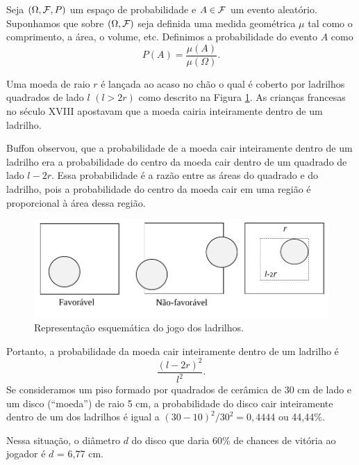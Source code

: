 \begin{frame}
 \begin{defi}  Seja $(\Omega ,{\cal F}, P)$ um espaço de probabilidade e  $A \in {\cal F}$ um evento aleatório. Suponhamos que sobre $(\Omega ,{\cal F})$ seja definida uma medida geométrica $\mu$ tal como o comprimento, a área, o volume, etc. Definimos a probabilidade do evento $A$ como 
\begin{equation}
\label{pgeo}
P(A) = \frac{\mu(A)}{\mu(\Omega)}.
\end{equation}
\end{defi}

\begin{exem} 
Uma moeda de raio $r$ é lançada ao acaso no chão o qual é coberto por
ladrilhos quadrados de lado $l$ $(l > 2r)$ como descrito na Figura \ref{fig7}. As crianças francesas no século XVIII apostavam que a moeda
cairia inteiramente dentro de um ladrilho. 

Buffon observou, que a probabilidade de a moeda cair inteiramente dentro
de um ladrilho era a probabilidade do centro da moeda cair dentro de um
quadrado de lado $l - 2r$. Essa probabilidade é a razão entre as áreas do quadrado e do ladrilho,
pois a probabilidade do centro da moeda cair em uma região é proporcional
à área dessa região.


\end{exem}
\end{frame}

\begin{frame}

\begin{figure}[!htb]
\begin{center}
\includegraphics[angle=0, scale=0.5]{fig7.pdf}
\end{center}
\caption{\label{fig7} Representação esquemática do jogo dos ladrilhos.
}
\end{figure} 
  Portanto, a probabilidade da moeda cair inteiramente
dentro de um ladrilho é $$ \frac{( l-2r )^2}{l^2}.$$
Se consideramos um piso formado por quadrados de cerâmica de 30 cm de lado e um disco (``moeda'') de raio 5 cm, a probabilidade do disco cair inteiramente dentro de um dos ladrilhos é igual a $(30-10)^2/ 30^2 = 0,4444$ ou 44,44\%.


Nessa situação, o diâmetro $d$ do disco que daria 60\% de chances de vitória ao jogador é $d$ = 6,77 cm.
\end{frame}



